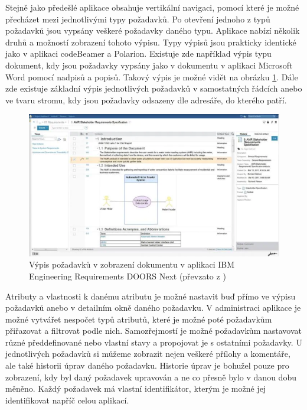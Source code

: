 \documentclass[czech,master,public,dept460,male,cpdeclaration,oneside]{diploma}
\begin{document}
Stejně jako předešlé aplikace obsahuje vertikální navigaci, pomocí které je možné přecházet mezi jednotlivými typy požadavků. Po otevření jednoho z typů požadavků jsou vypsány veškeré požadavky daného typu. Aplikace nabízí několik druhů a možností zobrazení tohoto výpisu. Typy výpisů jsou prakticky identické jako v aplikaci codeBeamer a Polarion. Existuje zde například výpis typu dokument, kdy jsou požadavky vypsány jako v dokumentu v aplikaci Microsoft Word pomocí nadpisů a popisů. Takový výpis je možné vidět na obrázku \ref{fig:ibm_doors_req}. Dále zde existuje základní výpis jednotlivých požadavků v samostatných řádcích anebo ve tvaru stromu, kdy jsou požadavky odsazeny dle adresáře, do kterého patří.

\begin{figure}[!ht]
    \centering
    \includegraphics[width=1\textwidth]{Diplomka/Figures/ibm_doors_ng_req.png}
    \caption{Výpis požadavků v zobrazení dokumentu v aplikaci IBM Engineering Requirements DOORS Next (převzato z \cite{ref:ibm_jazz_erm_dn})}
    \label{fig:ibm_doors_req}
\end{figure}
Atributy a vlastnosti k danému atributu je možné nastavit buď přímo ve výpisu požadavků anebo v detailním okně daného požadavku. V administraci aplikace je možné vytvářet nespočet typů atributů, které je možné poté požadavkům přiřazovat a filtrovat podle nich. Samozřejmostí je možné požadavkům nastavovat různé předdefinované nebo vlastní stavy a propojovat je s ostatními požadavky. U jednotlivých požadavků si můžeme zobrazit nejen veškeré přílohy a komentáře, ale také historii úprav daného požadavku. Historie úprav je bohužel pouze pro zobrazení, kdy byl daný požadavek upravován a ne co přesně bylo v danou dobu měněno. Každý požadavek má vlastní identifikátor, kterým je možné jej identifikovat napříč celou aplikací. 
\end{document}

